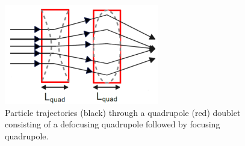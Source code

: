 \documentclass[../main.tex]{subfiles}
\begin{document}
\begin{figure}[!h]
\centering
\includegraphics[width=0.6\textwidth]{Figures/Energy_Recovery_Linac_Design/Quad_Doublet_fixed.pdf}
\caption{Particle trajectories (black) through a quadrupole (red) doublet consisting of a defocusing quadrupole followed by focusing quadrupole.}
\label{fig:quad_doublet}
\end{figure}
\end{document}
